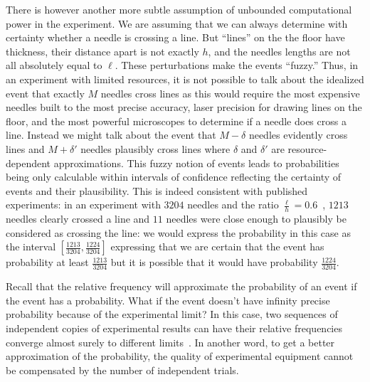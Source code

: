 \documentclass{article}
\theoremstyle{remark}
\begin{document}
There is however another more subtle assumption of unbounded
computational power in the experiment. We are assuming that we can
always determine with certainty whether a needle is crossing a
line. But ``lines'' on the the floor have thickness, their distance
apart is not exactly $h$, and the needles lengths 
are not all absolutely equal to $\ell$. These perturbations make
the events ``fuzzy.'' Thus, in an experiment with limited resources,
it is not possible to talk about the idealized event that exactly $M$
needles cross lines as this would require the most expensive needles
built to the most precise accuracy, laser precision for drawing lines
on the floor, and the most powerful microscopes to determine if a
needle does cross a line. Instead we might talk about the event that
$M-\delta$ needles evidently cross lines and $M+\delta'$ needles
plausibly cross lines where $\delta$ and $\delta'$ are
resource-dependent approximations. This fuzzy notion of events leads
to probabilities being only calculable within intervals of confidence
reflecting the certainty of events and their plausibility. This is
indeed consistent with published experiments: in an experiment with
$3204$ needles and the ratio $\frac{\ell}{h}=0.6$~\cite{DeMorgan1872},
$1213$ needles clearly crossed a line and $11$ needles were close
enough to plausibly be considered as crossing the line: we would
express the probability in this case as the interval
$\left[\frac{1213}{3204},\frac{1224}{3204}\right]$ expressing that we
are certain that the event has probability at least
$\frac{1213}{3204}$ but it is possible that it would have probability
$\frac{1224}{3204}$.

Recall that the relative frequency will approximate the probability
of an event if the event has a probability. What if the event doesn't
have infinity precise probability because of the experimental limit?
In this case, two sequences of independent copies of experimental
results can have their relative frequencies converge almost surely
to different limits~\cite{Marinacci1999,Teran2014}. In another word,
to get a better approximation of the probability, the quality of experimental
equipment cannot be compensated by the number of independent trials.

 
\end{document}

